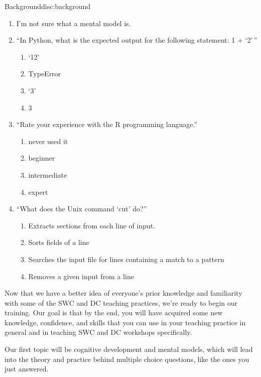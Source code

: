 \begin{discussion}{Background}{disc:background}
\begin{enumerate}
  \begin{enumerate}
  \item
    I'm not sure what a mental model is.
  \item
    ``In Python, what is the expected output for the following statement:
    1 + `2'\,''
    \begin{enumerate}
    \item
      `12'
    \item
      TypeError
    \item
      `3'
    \item
      3
    \end{enumerate}
  \item
    ``Rate your experience with the R programming language.''
    \begin{enumerate}
    \item
      never used it
    \item
      beginner
    \item
      intermediate
    \item
      expert
    \end{enumerate}
  \item
    ``What does the Unix command `cut' do?''
    \begin{enumerate}
    \item
      Extracts sections from each line of input.
    \item
      Sorts fields of a line
    \item
      Searches the input file for lines containing a match to a pattern
    \item
      Removes a given input from a line
    \end{enumerate}
  \end{enumerate}
\end{enumerate}

\end{discussion}

Now that we have a better idea of everyone's prior knowledge and
familiarity with some of the SWC and DC teaching practices, we're ready
to begin our training. Our goal is that by the end, you will have
acquired some new knowledge, confidence, and skills that you can use in
your teaching practice in general and in teaching SWC and DC workshops
specifically.

Our first topic will be cognitive development and mental models, which
will lead into the theory and practice behind multiple choice questions,
like the ones you just answered.
